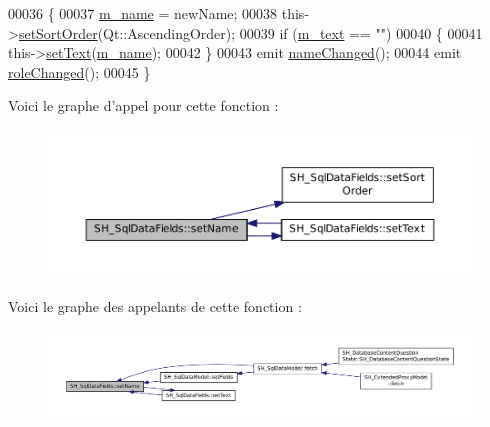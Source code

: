 \begin{DoxyCode}
00036 \{
00037     \hyperlink{classSH__SqlDataFields_a3c0e82a8b6652335bdc53b211d39d4e2}{m\_name} = newName;
00038     this->\hyperlink{classSH__SqlDataFields_a6ace4d4f29e74ce3ed81f75a2c278e83}{setSortOrder}(Qt::AscendingOrder);
00039     \textcolor{keywordflow}{if} (\hyperlink{classSH__SqlDataFields_a55352d3aea0863fcab26c948babe8523}{m\_text} == \textcolor{stringliteral}{""})
00040     \{
00041         this->\hyperlink{classSH__SqlDataFields_a377b4964546e91bd344c8c6f5190a833}{setText}(\hyperlink{classSH__SqlDataFields_a3c0e82a8b6652335bdc53b211d39d4e2}{m\_name});
00042     \}
00043     emit \hyperlink{classSH__SqlDataFields_ae3d52ec9938ab55f18ecdbcc5a8fd761}{nameChanged}();
00044     emit \hyperlink{classSH__SqlDataFields_a2f98ae1dff83fc150b9e836ad782e6bf}{roleChanged}();
00045 \}
\end{DoxyCode}


Voici le graphe d'appel pour cette fonction \-:
\nopagebreak
\begin{figure}[H]
\begin{center}
\leavevmode
\includegraphics[width=350pt]{classSH__SqlDataFields_ab658a817f459e5d0a8c0f5c4e8c28a9d_cgraph}
\end{center}
\end{figure}




Voici le graphe des appelants de cette fonction \-:
\nopagebreak
\begin{figure}[H]
\begin{center}
\leavevmode
\includegraphics[width=350pt]{classSH__SqlDataFields_ab658a817f459e5d0a8c0f5c4e8c28a9d_icgraph}
\end{center}
\end{figure}


